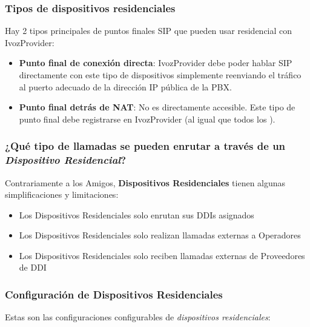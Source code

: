 \documentclass[letterpaper,10pt,spanish]{sphinxmanual}
\begin{document}
\subsubsection{Tipos de dispositivos residenciales}
\label{administration_portal/client/residential/residential_devices:types-of-residential-devices}
Hay 2 tipos principales de puntos finales SIP que pueden usar residencial con IvozProvider:
\begin{itemize}
\item {} 
\textbf{Punto final de conexión directa}: IvozProvider debe poder hablar SIP directamente con este tipo de dispositivos simplemente reenviando el tráfico al puerto adecuado de la dirección IP pública de la PBX.

\item {} 
\textbf{Punto final detrás de NAT}: No es directamente accesible. Este tipo de punto final debe registrarse en IvozProvider (al igual que todos los {\hyperref[administration_portal/client/vpbx/terminals:terminals]{}}).

\end{itemize}


\subsubsection{¿Qué tipo de llamadas se pueden enrutar a través de un \emph{Dispositivo Residencial}?}
\label{administration_portal/client/residential/residential_devices:what-kind-of-calls-can-be-routed-through-a-residential-device}
Contrariamente a los Amigos, \textbf{Dispositivos Residenciales} tienen algunas simplificaciones y limitaciones:
\begin{itemize}
\item {} 
Los Dispositivos Residenciales solo enrutan sus DDIs asignados

\item {} 
Los Dispositivos Residenciales solo realizan llamadas externas a Operadores

\item {} 
Los Dispositivos Residenciales solo reciben llamadas externas de Proveedores de DDI

\end{itemize}


\subsubsection{Configuración de Dispositivos Residenciales}
\label{administration_portal/client/residential/residential_devices:residential-devices-configuration}
Estas son las configuraciones configurables de \emph{dispositivos residenciales}:
\end{document}
